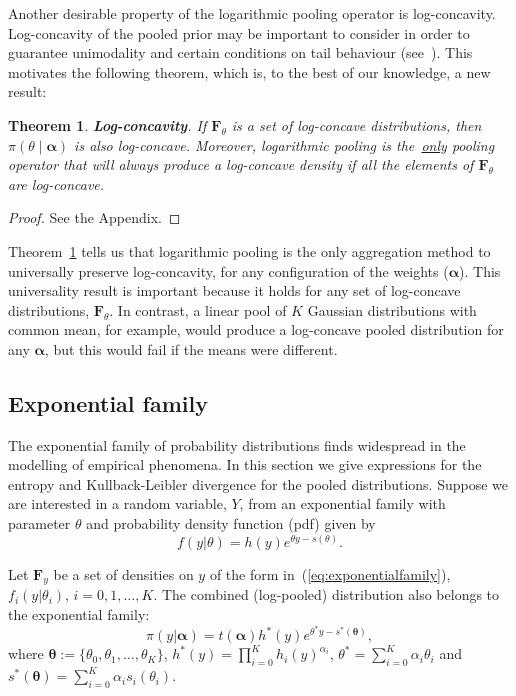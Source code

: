 \documentclass[a4paper, notitlepage, 10pt]{article}
\newtheorem{theo}{Theorem}[]
\begin{document}
Another desirable property of the logarithmic pooling operator is log-concavity.
Log-concavity of the pooled prior may be important to consider in order to guarantee unimodality and certain conditions on tail behaviour (see~\cite{Bagnoli2005}).
This motivates the following theorem, which is, to the best of our knowledge, a new result:
\begin{theo}
\label{thm:concavity}
\textbf{Log-concavity}. 
If $\mathbf{F}_{\theta}$ is a set of log-concave distributions, then $\pi(\theta\mid \boldsymbol \alpha)$ is also log-concave.
Moreover, logarithmic pooling is the~\underline{only} pooling operator that will always produce a log-concave density if all the elements of $\mathbf{F}_{\theta}$  are log-concave.
\end{theo}
\begin{proof}
 See the Appendix.
\end{proof} 
Theorem~\ref{thm:concavity} tells us that logarithmic pooling is the only aggregation method to universally preserve log-concavity, for any configuration of the weights ($\boldsymbol{\alpha}$).
This universality result is important because it holds for any set of log-concave distributions, $\mathbf{F}_{\theta}$.
In contrast, a linear pool of $K$ Gaussian distributions with common mean, for example, would produce a log-concave pooled distribution for any $\boldsymbol{\alpha}$, but this would fail if the means were different.

\subsection{Exponential family}
\label{sec:expofamily}

The exponential family of probability distributions finds widespread in the modelling of empirical phenomena.
In this section we give expressions for the entropy and Kullback-Leibler divergence for the pooled distributions. 
Suppose we are interested in a random variable, $Y$, from an exponential family with parameter $\theta$ and probability density function (pdf) given by
\begin{equation}
\label{eq:exponentialfamily}
f(y|\theta) = h(y) e^{\theta y - s(\theta)}.
\end{equation}

Let $\mathbf{F}_{y}$ be a set of densities on $y$ of the form in~(\ref{eq:exponentialfamily}), $f_i(y|\theta_i)$, $ i = 0, 1, \ldots, K$. 
The combined (log-pooled) distribution also belongs to the exponential family:
\begin{equation}
\label{eq:pooldistEF}
\pi(y| \boldsymbol\alpha ) = t(\boldsymbol\alpha) h^\ast (y) e^{\theta^\ast y - s^\ast (\boldsymbol\theta)},
\end{equation}
where $\boldsymbol\theta :=\{\theta_0, \theta_1, \ldots, \theta_K \}$, $h^\ast (y) = \prod_{i = 0}^K h_i(y)^{\alpha_i}$,  $\theta^\ast = \sum_{i = 0}^K \alpha_i \theta_i$ and $s^\ast (\boldsymbol\theta) = \sum_{i = 0}^K \alpha_i s_i(\theta_i)$.
\end{document}
